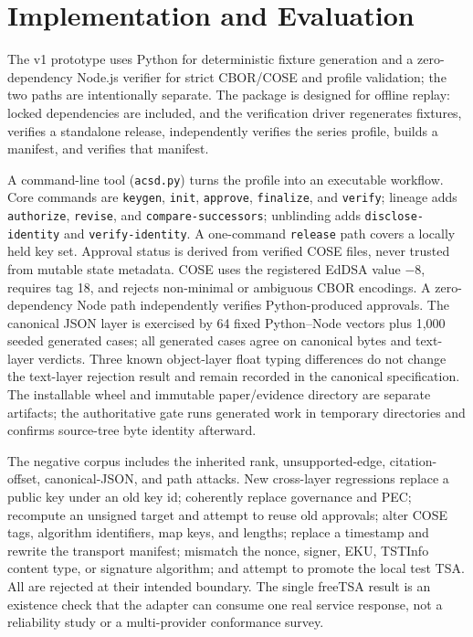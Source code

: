 \documentclass[11pt]{article}
\begin{document}
\section{Implementation and Evaluation}

The v1 prototype uses Python for deterministic fixture generation and a zero-dependency Node.js verifier for strict CBOR/COSE and profile validation; the two paths are intentionally separate. The package is designed for offline replay: locked dependencies are included, and the verification driver regenerates fixtures, verifies a standalone release, independently verifies the series profile, builds a manifest, and verifies that manifest.

A command-line tool (\texttt{acsd.py}) turns the profile into an executable
workflow. Core commands are \texttt{keygen}, \texttt{init}, \texttt{approve},
\texttt{finalize}, and \texttt{verify}; lineage adds \texttt{authorize},
\texttt{revise}, and \texttt{compare-successors}; unblinding adds
\texttt{disclose-identity} and \texttt{verify-identity}. A one-command
\texttt{release} path covers a locally held key set. Approval status is derived
from verified COSE files, never trusted from mutable state metadata. COSE uses
the registered EdDSA value $-8$, requires tag 18, and rejects non-minimal or
ambiguous CBOR encodings. A zero-dependency Node path independently verifies
Python-produced approvals. The canonical JSON layer is exercised by 64 fixed
Python--Node vectors plus 1,000 seeded generated cases; all generated cases
agree on canonical bytes and text-layer verdicts. Three known object-layer
float typing differences do not change the text-layer rejection result and
remain recorded in the canonical specification. The installable wheel and
immutable paper/evidence directory are separate artifacts; the authoritative
gate runs generated work in temporary directories and confirms source-tree
byte identity afterward.

The negative corpus includes the inherited rank, unsupported-edge,
citation-offset, canonical-JSON, and path attacks. New cross-layer regressions
replace a public key under an old key id; coherently replace governance and PEC;
recompute an unsigned target and attempt to reuse old approvals; alter COSE tags,
algorithm identifiers, map keys, and lengths; replace a timestamp and rewrite
the transport manifest; mismatch the nonce, signer, EKU, TSTInfo content type,
or signature algorithm; and attempt to promote the local test TSA. All are
rejected at their intended boundary. The single freeTSA result is an existence
check that the adapter can consume one real service response, not a reliability
study or a multi-provider conformance survey.
\end{document}
